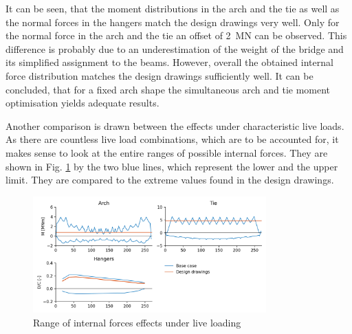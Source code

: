 It can be seen, that the moment distributions in the arch and the tie as well as the normal forces in the hangers match the design drawings very well. Only for the normal force in the arch and the tie an offset of \SI{2}{MN} can be observed. This difference is probably due to an underestimation of the weight of the bridge and its simplified assignment to the beams. However, overall the obtained internal force distribution matches the design drawings sufficiently well. It can be concluded, that for a fixed arch shape the simultaneous arch and tie moment optimisation yields adequate results.\medskip

Another comparison is drawn between the effects under characteristic live loads. As there are countless live load combinations, which are to be accounted for, it makes sense to look at the entire ranges of possible internal forces. They are shown in Fig. \ref{fig:base_case_live} by the two blue lines, which represent the lower and the upper limit. They are compared to the extreme values found in the design drawings.

\begin{figure}[H]
    \centering
    \includegraphics[width=0.8\textwidth]{calculations/Base case/Live load.png}
    \caption{Range of internal forces effects under live loading}
    \label{fig:base_case_live}
\end{figure}


